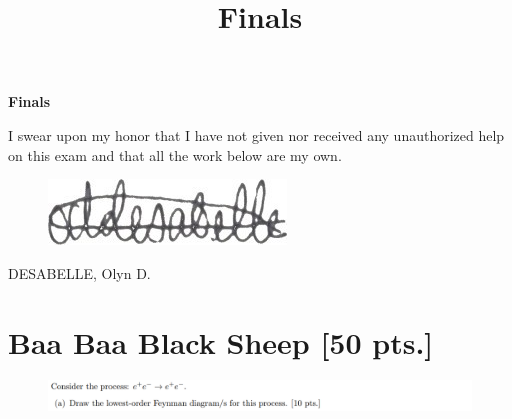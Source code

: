 \documentclass[11pt]{article}
\theoremstyle{definition}
\numberwithin{equation}{section}
\begin{document}
\title{Finals}

\pagestyle{fancy}
\fancyhf{}

\begin{center}
{\LARGE \bf Finals}\\
\end{center}

\begin{mdframed}
    I swear upon my honor that I have not given nor received any unauthorized help on this exam and that all the work below are my own.
\end{mdframed}
\begin{figure}[H]
    \includegraphics[scale = 20]{my e-sig.jpg}
\end{figure}

DESABELLE, Olyn D.

\noindent\makebox[\linewidth]{\rule{\paperwidth}{0.4pt}}

\section{\textbf{Baa Baa Black Sheep} [50 pts.]}


\begin{figure}[H]
    \centering
    \includegraphics[scale = 0.4]{1a.png}
\end{figure}


\end{document}
